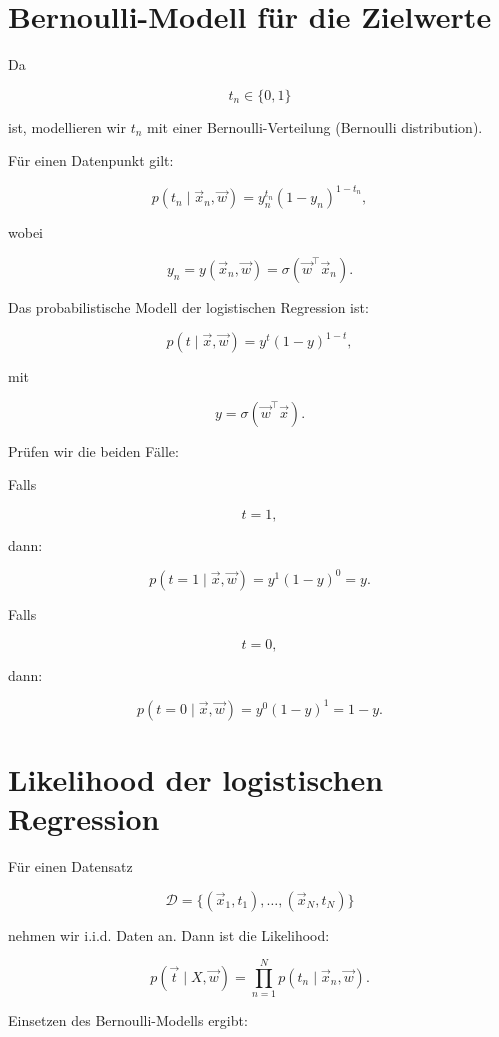 \section{Bernoulli-Modell für die Zielwerte}

Da

\[
    t_n \in \{0,1\}
\]

ist, modellieren wir \(t_n\) mit einer Bernoulli-Verteilung (Bernoulli distribution).

Für einen Datenpunkt gilt:

\[
    p(t_n\mid\vec{x}_n,\vec{w})
    =
    y_n^{t_n}
    (1-y_n)^{1-t_n},
\]

wobei

\[
    y_n
    =
    y(\vec{x}_n,\vec{w})
    =
    \sigma(\vec{w}^{\top}\vec{x}_n).
\]

\begin{definitionbox}
Das probabilistische Modell der logistischen Regression ist:

\[
    p(t\mid\vec{x},\vec{w})
    =
    y^t(1-y)^{1-t},
\]

mit

\[
    y
    =
    \sigma(\vec{w}^{\top}\vec{x}).
\]
\end{definitionbox}

Prüfen wir die beiden Fälle:

Falls

\[
    t=1,
\]

dann:

\[
    p(t=1\mid\vec{x},\vec{w})
    =
    y^1(1-y)^0
    =
    y.
\]

Falls

\[
    t=0,
\]

dann:

\[
    p(t=0\mid\vec{x},\vec{w})
    =
    y^0(1-y)^1
    =
    1-y.
\]

\section{Likelihood der logistischen Regression}

Für einen Datensatz

\[
    \mathcal{D}
    =
    \{(\vec{x}_1,t_1),\dots,(\vec{x}_N,t_N)\}
\]

nehmen wir i.i.d. Daten an.
Dann ist die Likelihood:

\[
    p(\vec{t}\mid X,\vec{w})
    =
    \prod_{n=1}^{N}
    p(t_n\mid\vec{x}_n,\vec{w}).
\]

Einsetzen des Bernoulli-Modells ergibt:

